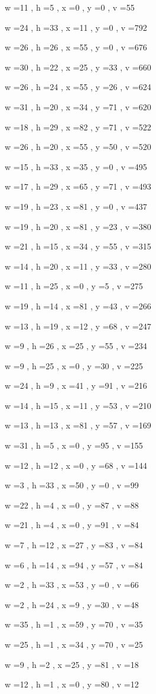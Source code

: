 \documentclass[11pt]{article}
\begin{document}
w =11 , h =5 , x =0 , y =0 , v =55
\par
w =24 , h =33 , x =11 , y =0 , v =792
\par
w =26 , h =26 , x =55 , y =0 , v =676
\par
w =30 , h =22 , x =25 , y =33 , v =660
\par
w =26 , h =24 , x =55 , y =26 , v =624
\par
w =31 , h =20 , x =34 , y =71 , v =620
\par
w =18 , h =29 , x =82 , y =71 , v =522
\par
w =26 , h =20 , x =55 , y =50 , v =520
\par
w =15 , h =33 , x =35 , y =0 , v =495
\par
w =17 , h =29 , x =65 , y =71 , v =493
\par
w =19 , h =23 , x =81 , y =0 , v =437
\par
w =19 , h =20 , x =81 , y =23 , v =380
\par
w =21 , h =15 , x =34 , y =55 , v =315
\par
w =14 , h =20 , x =11 , y =33 , v =280
\par
w =11 , h =25 , x =0 , y =5 , v =275
\par
w =19 , h =14 , x =81 , y =43 , v =266
\par
w =13 , h =19 , x =12 , y =68 , v =247
\par
w =9 , h =26 , x =25 , y =55 , v =234
\par
w =9 , h =25 , x =0 , y =30 , v =225
\par
w =24 , h =9 , x =41 , y =91 , v =216
\par
w =14 , h =15 , x =11 , y =53 , v =210
\par
w =13 , h =13 , x =81 , y =57 , v =169
\par
w =31 , h =5 , x =0 , y =95 , v =155
\par
w =12 , h =12 , x =0 , y =68 , v =144
\par
w =3 , h =33 , x =50 , y =0 , v =99
\par
w =22 , h =4 , x =0 , y =87 , v =88
\par
w =21 , h =4 , x =0 , y =91 , v =84
\par
w =7 , h =12 , x =27 , y =83 , v =84
\par
w =6 , h =14 , x =94 , y =57 , v =84
\par
w =2 , h =33 , x =53 , y =0 , v =66
\par
w =2 , h =24 , x =9 , y =30 , v =48
\par
w =35 , h =1 , x =59 , y =70 , v =35
\par
w =25 , h =1 , x =34 , y =70 , v =25
\par
w =9 , h =2 , x =25 , y =81 , v =18
\par
w =12 , h =1 , x =0 , y =80 , v =12
\par
\newpage
\end{document}
